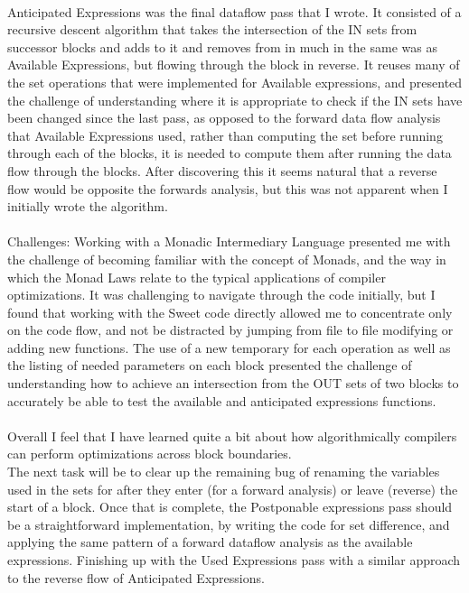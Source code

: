 \documentclass[14pt]{article}
\begin{document}
\paragraph{}
Anticipated Expressions was the final dataflow pass that I wrote. It consisted of a recursive descent algorithm that takes the intersection of the IN sets from successor blocks and adds to it and removes from in much in the same was as Available Expressions, but flowing through the block in reverse. It reuses many of the set operations that were implemented for Available expressions, and presented the challenge of understanding where it is appropriate to check if the IN sets have been changed since the last pass, as opposed to the forward data flow analysis that Available Expressions used, rather than computing the set before running through each of the blocks, it is needed to compute them after running the data flow through the blocks. After discovering this it seems natural that a reverse flow would be opposite the forwards analysis, but this was not apparent when I initially wrote the algorithm.\pagebreak
\paragraph{}
Challenges: Working with a Monadic Intermediary Language presented me with the challenge of becoming familiar with the concept of Monads, and the way in which the Monad Laws relate to the typical applications of compiler optimizations. It was challenging to navigate through the code initially, but I found that working with the Sweet code directly allowed me to concentrate only on the code flow, and not be distracted by jumping from file to file modifying or adding new functions. The use of a new temporary for each operation as well as the listing of needed parameters on each block presented the challenge of understanding how to achieve an intersection from the OUT sets of two blocks to accurately be able to test the available and anticipated expressions functions.
\paragraph{}
Overall I feel that I have learned quite a bit about how algorithmically compilers can perform optimizations across block boundaries.\\
The next task will be to clear up the remaining bug of renaming the variables used in the sets for after they enter (for a forward analysis) or leave (reverse) the start of a block. Once that is complete, the Postponable expressions pass should be a straightforward implementation, by writing the code for set difference, and applying the same pattern of a forward dataflow analysis as the available expressions. Finishing up with the Used Expressions pass with a similar approach to the reverse flow of Anticipated Expressions. \\
\end{document}
